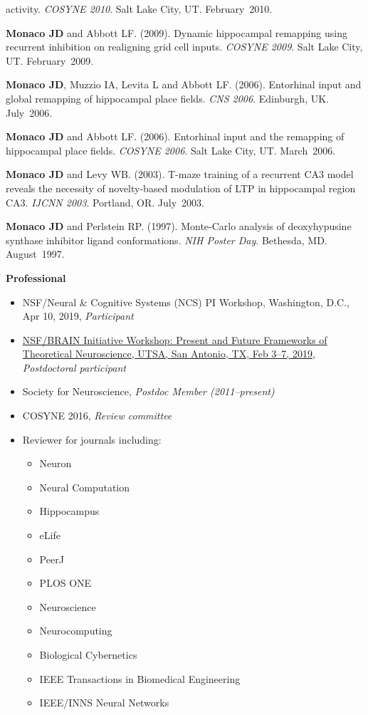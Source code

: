 \documentclass[10pt]{article}
\begin{document}
\begin{description}
{activity. \emph{COSYNE 2010}. Salt Lake City, UT. February~2010.}
\item[\quad] \textbf{Monaco JD} and Abbott LF. (2009). Dynamic hippocampal
remapping using recurrent inhibition on realigning grid cell inputs.
\emph{COSYNE 2009}. Salt Lake City, UT. February~2009.
\item[\quad] \textbf{Monaco JD}, Muzzio IA, Levita L and Abbott LF. (2006).
Entorhinal input and global remapping of hippocampal place fields. \emph{CNS
2006}. Edinburgh, UK. July~2006.
\item[\quad] \textbf{Monaco JD} and Abbott LF. (2006). Entorhinal input and the
remapping of hippocampal place fields. \emph{COSYNE 2006}. Salt Lake City, UT.
March~2006.
\item[\quad] \textbf{Monaco JD} and Levy WB. (2003). T-maze training of a
recurrent CA3 model reveals the necessity of novelty-based modulation of LTP in
hippocampal region CA3. \emph{IJCNN 2003}. Portland, OR. July~2003.
\item[\quad] \textbf{Monaco JD} and Perlstein RP. (1997). Monte-Carlo analysis
of deoxyhypusine synthase inhibitor ligand conformations. \emph{NIH Poster Day}.
Bethesda, MD. August~1997.
\end{description}

{\large \textbf{Professional}}
\begin{itemize}
  \item NSF/Neural \& Cognitive Systems (NCS) PI Workshop, Washington, D.C., Apr
10, 2019, \emph{Participant}
  \item \href{https://www.utsa.edu/SantamariaLab/Workshop/index.html}{NSF/BRAIN
Initiative Workshop: Present and Future Frameworks of Theoretical Neuroscience,
UTSA, San Antonio, TX, Feb 3--7, 2019}, \emph{Postdoctoral participant}
  \item Society for Neuroscience, \emph{Postdoc Member (2011--present)}
  \item COSYNE 2016, \emph{Review committee}
  \item Reviewer for journals including:
  \begin{itemize}
    \item Neuron
    \item Neural Computation
    \item Hippocampus
    \item eLife
    \item PeerJ
    \item PLOS ONE
    \item Neuroscience
    \item Neurocomputing
    \item Biological Cybernetics
    \item IEEE Transactions in Biomedical Engineering
    \item IEEE/INNS Neural Networks
  \end{itemize}
\end{itemize}
\end{document}
